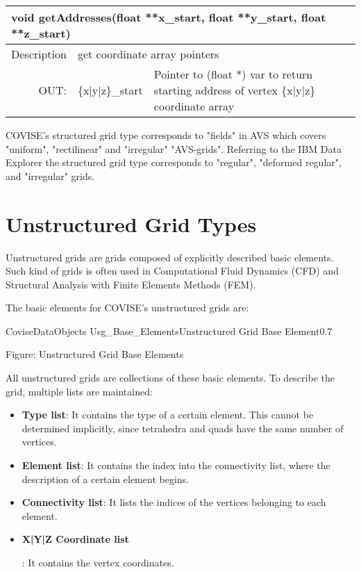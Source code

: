 \begin{htmlonly}
\begin{longtable}{|p{4cm}|p{2.5cm}|p{7cm}|}
\hline
\multicolumn{3}{|p{13.5cm}|}{\bf void getAddresses(float **x\_start, float **y\_start, 
                       float **z\_start)}\\
\hline
{Description} & 
\multicolumn{2}{p{9.5cm}|}{get coordinate array pointers} \\
\hline
\multicolumn{1}{|r|}{OUT:} & \multicolumn{1}{p{3cm}|}{\{x|y|z\}\_start} 
                          & \multicolumn{1}{p{5cm}|}{Pointer to (float *) var
			  to return starting address of vertex
			  \{x|y|z\} coordinate array}\endhead
\hline
\end{longtable} 
\end{htmlonly}

COVISE's structured grid type corresponds to "fields" in AVS which covers 
"uniform", "rectilinear" and "irregular" "AVS-grids". Referring to the IBM
Data Explorer the structured grid type corresponds to "regular", "deformed 
regular", and "irregular" grids.



\section{Unstructured Grid Types}

Unstructured grids are grids composed of explicitly described basic elements. 
Such kind of grids is often used in Computational Fluid Dynamics (CFD)
and Structural Analysis with Finite Elements Methods (FEM).

The basic elements for COVISE's unstructured grids are:

\begin{covimg}{CoviseDataObjects}
	   {Usg_Base_Elements}{Unstructured Grid Base Element}{0.7}\end{covimg}
\begin{htmlonly}
Figure: Unstructured Grid Base Elements
\end{htmlonly}
\vspace*{1cm}

All unstructured grids are collections of these basic elements. To describe the grid, multiple lists are maintained:

\begin{itemize}
\item {\bf Type list}: It contains the type of a certain element. This cannot be 
determined implicitly, since tetrahedra and quads have the same number of vertices. 
\item {\bf Element list}: It contains the index into the connectivity list, where 
the description of a certain element begins.
\item {\bf Connectivity list}: It lists the indices of the vertices belonging to 
each element.
\item {}\endlatexonly
\begin{htmlonly}{\bf X|Y|Z Coordinate list}\end{htmlonly}: It contains the vertex coordinates.
\end{itemize}

